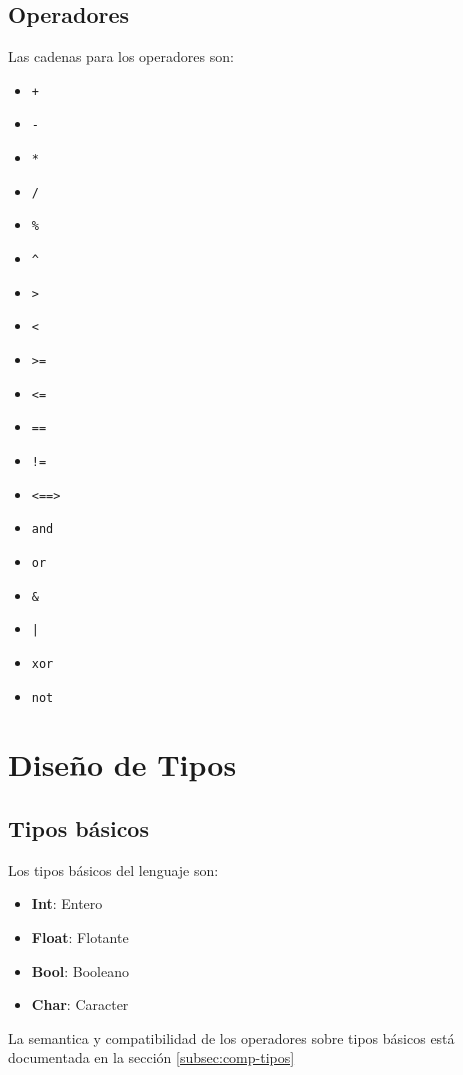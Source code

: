 \documentclass[12pt, spanish]{report}
\begin{document}
\section{Operadores}
\label{sec:agrup}
Las cadenas para los operadores son:
\begin{itemize}
\item \texttt{+}
\item \texttt{-}
\item \texttt{*}
\item \texttt{/}
\item \texttt{\%}
\item \texttt{\^}
\item \texttt{>}
\item \texttt{<}
\item \texttt{>=}
\item \texttt{<=}
\item \texttt{==}
\item \texttt{!=}
\item \texttt{<==>}
\item \texttt{and}
\item \texttt{or}
\item \texttt{\&}
\item \texttt{|}
\item \texttt{xor}
\item \texttt{not}
\end{itemize}

\chapter{Dise\~no de Tipos}
\label{sec:tipos}

\section{Tipos b\'asicos}
\label{sec:tiposbasicos}

Los tipos b\'asicos del lenguaje son:

\begin{itemize}
\item \textbf{Int}: Entero
\item \textbf{Float}: Flotante
\item \textbf{Bool}: Booleano
\item \textbf{Char}: Caracter 
\end{itemize}
La semantica y compatibilidad de los operadores sobre 
tipos b\'asicos est\'a documentada en la secci\'on \ref{subsec:comp-tipos}
\end{document}
